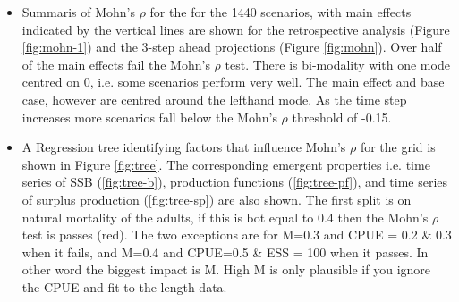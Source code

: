 \begin{itemize}
   \item Summaris of Mohn's $\rho$ for the for the 1440 scenarios, with main effects indicated by the vertical lines are shown for the retrospective analysis (Figure \ref{fig:mohn-1}) and the 3-step ahead projections (Figure \ref{fig:mohn}). Over half of the main effects fail the Mohn's $\rho$ test. There is bi-modality with one mode centred on 0, i.e. some scenarios perform very well. The main effect and base case, however are centred around the lefthand mode. As the time step increases more scenarios fall below the Mohn's $\rho$ threshold of -0.15. 

   
   

   \item A Regression tree identifying factors that influence Mohn's $\rho$ for the grid is shown in Figure \ref{fig:tree}. The corresponding emergent properties i.e. time series of SSB (\ref{fig:tree-b}), production functions (\ref{fig:tree-pf}), and time series of surplus production (\ref{fig:tree-sp}) are also shown. The first split is on natural mortality of the adults, if this is bot equal to 0.4 then the Mohn's $\rho$ test is passes (red). The two exceptions are for M=0.3 and CPUE = 0.2 \& 0.3 when it fails, and M=0.4 and CPUE=0.5 \& ESS = 100 when it passes. In other word the biggest impact is M. High M is only plausible if you ignore the CPUE and fit to the length data. 
  

\end{itemize}
